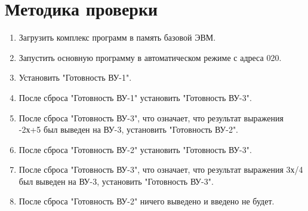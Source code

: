 \documentclass[a4paper,14pt]{article}
\begin{document}
\section {Методика проверки}

\begin{enumerate}
    \item Загрузить комплекс программ в память базовой ЭВМ.
    \item Запустить основную программу в автоматическом режиме с адреса 020.
    \item Установить "Готовность ВУ-1".
    \item После сброса "Готовность ВУ-1" установить "Готовность ВУ-3".
    \item После сброса "Готовность ВУ-3", что означает, что результат выражения -2х+5 был выведен на ВУ-3, установить "Готовность ВУ-2".
    \item После сброса "Готовность ВУ-2" установить "Готовность ВУ-3".
    \item После сброса "Готовность ВУ-3", что означает, что результат выражения 3х/4 был выведен на ВУ-3, установить "Готовность ВУ-3".
    \item После сброса "Готовность ВУ-2" ничего выведено и введено не будет.

\end{enumerate}
\end{document}
